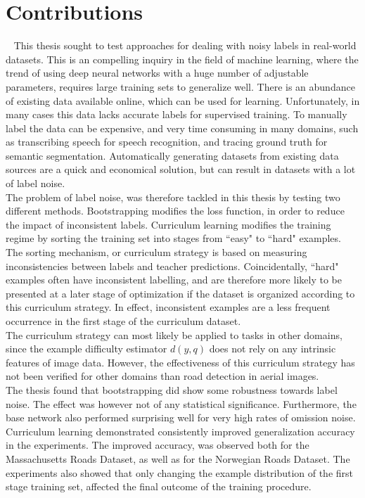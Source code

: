 \section{Contributions}~\label{cont}
\label{sec:Contributions}
This thesis sought to test approaches for dealing with noisy labels in real-world datasets. This is an compelling inquiry in the field of machine learning, where the trend of using deep neural networks with a huge number of adjustable parameters, requires large training sets to generalize well. There is an abundance of existing data available online, which can be used for learning. Unfortunately, in many cases this data lacks accurate labels for supervised training. To manually label the data can be expensive, and very time consuming in many domains, such as transcribing speech for speech recognition, and tracing ground truth for semantic segmentation. Automatically generating datasets from existing data sources are a quick and economical solution, but can result in datasets with a lot of label noise.\\

The problem of label noise, was therefore tackled in this thesis by testing two different methods. Bootstrapping modifies the loss function, in order to reduce the impact of inconsistent labels. Curriculum learning modifies the training regime by sorting the training set into stages from ``easy" to ``hard" examples. The sorting mechanism, or curriculum strategy is based on measuring inconsistencies between labels and teacher predictions. Coincidentally, ``hard" examples often have inconsistent labelling, and are therefore more likely to be presented at a later stage of optimization if the dataset is organized according to this curriculum strategy. In effect, inconsistent examples are a less frequent occurrence in the first stage of the curriculum dataset.\\
 
The curriculum strategy can most likely be applied to tasks in other domains, since the example difficulty estimator $d(y,q)$ does not rely on any intrinsic features of image data. However, the effectiveness of this curriculum strategy has not been verified for other domains than road detection in aerial images.\\

The thesis found that bootstrapping did show some robustness towards label noise. The effect was however not of any statistical significance. Furthermore, the base network also performed surprising well for very high rates of omission noise.\\

Curriculum learning demonstrated consistently improved generalization accuracy in the experiments. The improved accuracy, was observed both for the Massachusetts Roads Dataset, as well as for the Norwegian Roads Dataset. The experiments also showed that only changing the example distribution of the first stage training set, affected the final outcome of the training procedure.\\

